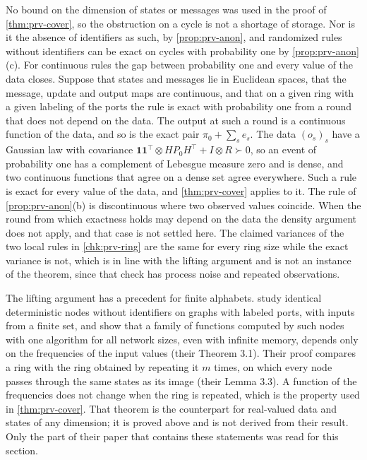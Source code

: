 \begin{remark}\label{rem:prv-cover-scope}
No bound on the dimension of states or messages was used in the proof of \cref{thm:prv-cover}, so the obstruction on a cycle is not a shortage of storage. Nor is it the absence of identifiers as such, by \cref{prop:prv-anon}, and randomized rules without identifiers can be exact on cycles with probability one by \cref{prop:prv-anon}(c). For continuous rules the gap between probability one and every value of the data closes. Suppose that states and messages lie in Euclidean spaces, that the message, update and output maps are continuous, and that on a given ring with a given labeling of the ports the rule is exact with probability one from a round that does not depend on the data. The output at such a round is a continuous function of the data, and so is the exact pair $\pi_0+\sum_se_s$. The data $(o_s)_s$ have a Gaussian law with covariance $\mathbf 1\mathbf 1^\top\otimes HP_0H^\top+I\otimes R\succ0$, so an event of probability one has a complement of Lebesgue measure zero and is dense, and two continuous functions that agree on a dense set agree everywhere. Such a rule is exact for every value of the data, and \cref{thm:prv-cover} applies to it. The rule of \cref{prop:prv-anon}(b) is discontinuous where two observed values coincide. When the round from which exactness holds may depend on the data the density argument does not apply, and that case is not settled here. The claimed variances of the two local rules in \cref{chk:prv-ring} are the same for every ring size while the exact variance is not, which is in line with the lifting argument and is not an instance of the theorem, since that check has process noise and repeated observations.

The lifting argument has a precedent for finite alphabets. \citet{hendrickx2010distributed} study identical deterministic nodes without identifiers on graphs with labeled ports, with inputs from a finite set, and show that a family of functions computed by such nodes with one algorithm for all network sizes, even with infinite memory, depends only on the frequencies of the input values (their Theorem 3.1). Their proof compares a ring with the ring obtained by repeating it $m$ times, on which every node passes through the same states as its image (their Lemma 3.3). A function of the frequencies does not change when the ring is repeated, which is the property used in \cref{thm:prv-cover}. That theorem is the counterpart for real-valued data and states of any dimension; it is proved above and is not derived from their result. Only the part of their paper that contains these statements was read for this section.
\end{remark}

